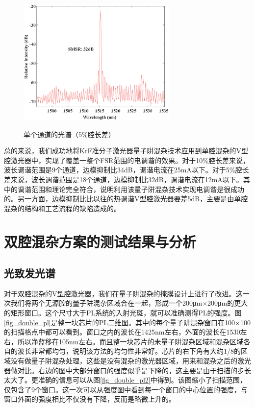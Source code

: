 \documentclass{ZJUthesis}
\begin{document}
\begin{figure}[!ht]
  \centering
  \includegraphics[width=0.7\textwidth]{./Pictures/single_spectrum_p5.eps}\\
  \caption{单个通道的光谱（5\%腔长差）}
  \label{fig_single_spectrum_p5}
\end{figure}

总的来说，我们成功地将KrF准分子激光器量子阱混杂技术应用到单腔混杂的V型腔激光器中，实现了覆盖一整个FSR范围的电调谐的效果。对于10\%腔长差来说，波长调谐范围是9个通道，边模抑制比34dB，调谐电流在25mA以下。对于5\%腔长差来说，波长调谐范围是18个通道，边模抑制比32dB，调谐电流在12mA以下。其中的调谐范围和理论完全符合，说明利用该量子阱混杂技术实现电调谐是很成功的。另一方面，边模抑制比比以往的热调谐V型腔激光器要差5dB，主要是由单腔混杂的结构和工艺流程的缺陷造成的。

\section{双腔混杂方案的测试结果与分析}

\subsection{光致发光谱}

对于双腔混杂的V型腔激光器，我们在量子阱混杂的掩膜设计上进行了改进。这一次我们将两个无源腔的量子阱混杂区域合在一起，形成一个200μm×200μm的更大的矩形窗口。这个尺寸大于PL系统的入射光斑，就可以准确测得PL的强度。图\ref{fig_double_pl}是整一块芯片的PL二维图。其中的每个量子阱混杂窗口在100×100的扫描格点中都可以看到。窗口之内的波长在1425nm左右，外面的波长在1530左右，所以净蓝移在105nm左右。而且整一块芯片的未量子阱混杂区域和混杂区域各自的波长非常都均匀，说明该方法的均匀性非常好。芯片的右下角有大约1/8的区域没有做量子阱混杂处理，这些是没有混杂的激光器区域，用来和混杂之后的激光器做对比。右边的图中大部分窗口的强度似乎是下降的，这主要是由于扫描的步长太大了。更准确的信息可以从图\ref{fig_double_pl2}中得到。该图缩小了扫描范围，仅包含了9个窗口。这一次可以从强度图中看到每一个窗口的中心位置的强度，与窗口外面的强度相比不仅没有下降，反而是略微上升的。
\end{document}

